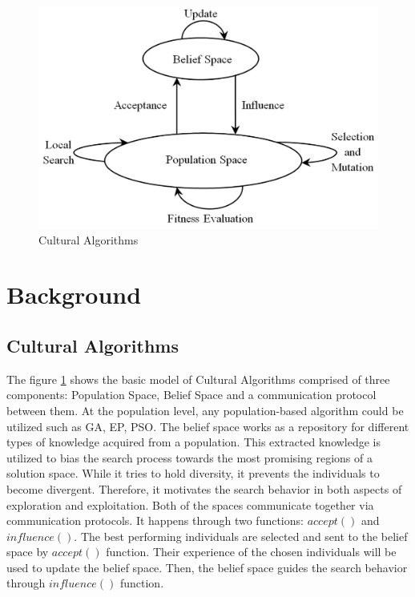 \documentclass[letterpaper]{article}
\begin{document}
\begin{figure}[h]
	\includegraphics[scale=0.11]{CA}
	\centering
	\caption{Cultural Algorithms \cite{kobti2013heterogeneous}}
	\label{ref:CA}
\end{figure}
\section{Background}
\subsection{Cultural Algorithms}
The figure \ref{ref:CA} shows the basic model of Cultural Algorithms comprised of three components: Population Space, Belief Space and a communication protocol between them. At the population level, any population-based algorithm could be utilized such as GA, EP, PSO. The belief space works as a repository for different types of knowledge acquired from a population. This extracted knowledge is utilized to bias the search process towards the most promising regions of a solution space. While it tries to hold diversity, it prevents the individuals to become divergent. Therefore, it motivates the search behavior in both aspects of exploration and exploitation. Both of the spaces communicate together via communication protocols. It happens through two functions: $accept()$ and $influence()$. The best performing individuals are selected and sent to the belief space by $accept()$ function. Their experience of the chosen individuals will be used to update the belief space. Then, the belief space guides the search behavior through $influence()$ function.
\end{document}
